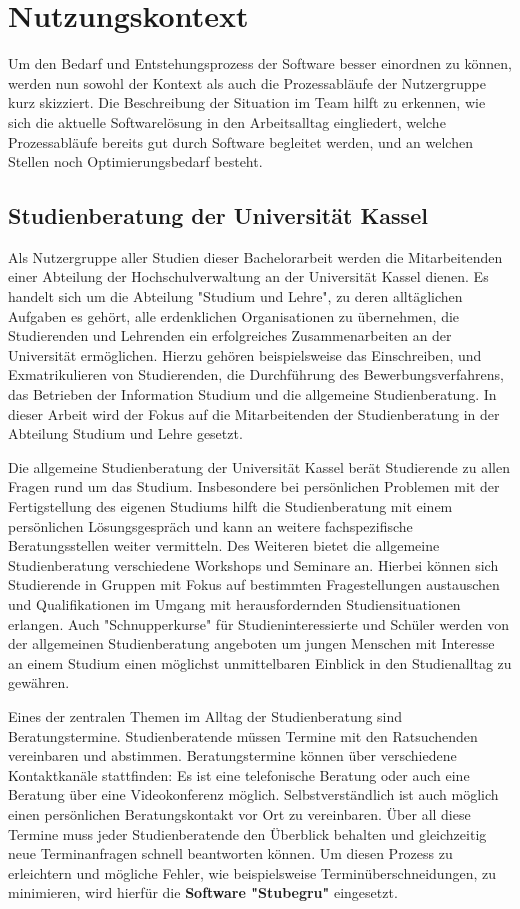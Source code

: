 \chapter{Nutzungskontext}
\label{chapterPractice}

Um den Bedarf und Entstehungsprozess der Software besser einordnen zu können,
werden nun sowohl der Kontext als auch die Prozessabläufe der Nutzergruppe kurz
skizziert. Die Beschreibung der Situation im Team hilft zu erkennen, wie sich
die aktuelle Softwarelösung in den Arbeitsalltag eingliedert, welche
Prozessabläufe bereits gut durch Software begleitet werden, und an welchen
Stellen noch Optimierungsbedarf besteht.

\section{Studienberatung der Universität Kassel}
Als Nutzergruppe aller Studien dieser Bachelorarbeit werden die Mitarbeitenden
einer Abteilung der Hochschulverwaltung an der Universität Kassel dienen. Es
handelt sich um die Abteilung "Studium und Lehre", zu deren alltäglichen
Aufgaben es gehört, alle erdenklichen Organisationen zu übernehmen, die
Studierenden und Lehrenden ein erfolgreiches Zusammenarbeiten an der
Universität ermöglichen. Hierzu gehören beispielsweise das Einschreiben, und
Exmatrikulieren von Studierenden, die Durchführung des Bewerbungsverfahrens,
das Betrieben der Information Studium und die allgemeine Studienberatung. In
dieser Arbeit wird der Fokus auf die Mitarbeitenden der Studienberatung in der
Abteilung Studium und Lehre gesetzt.

Die allgemeine Studienberatung der Universität Kassel berät Studierende zu
allen Fragen rund um das Studium. Insbesondere bei persönlichen Problemen mit
der Fertigstellung des eigenen Studiums hilft die Studienberatung mit einem
persönlichen Lösungsgespräch und kann an weitere fachspezifische
Beratungsstellen weiter vermitteln. Des Weiteren bietet die allgemeine
Studienberatung verschiedene Workshops und Seminare an. Hierbei können sich
Studierende in Gruppen mit Fokus auf bestimmten Fragestellungen austauschen und
Qualifikationen im Umgang mit herausfordernden Studiensituationen erlangen.
Auch "Schnupperkurse" für Studieninteressierte und Schüler werden von der
allgemeinen Studienberatung angeboten um jungen Menschen mit Interesse an einem
Studium einen möglichst unmittelbaren Einblick in den Studienalltag zu
gewähren.\cite{studBeratungKsWeb}

Eines der zentralen Themen im Alltag der Studienberatung sind Beratungstermine.
Studienberatende müssen Termine mit den Ratsuchenden vereinbaren und abstimmen.
Beratungstermine können über verschiedene Kontaktkanäle stattfinden: Es ist
eine telefonische Beratung oder auch eine Beratung über eine Videokonferenz
möglich. Selbstverständlich ist auch möglich einen persönlichen
Beratungskontakt vor Ort zu vereinbaren. Über all diese Termine muss jeder
Studienberatende den Überblick behalten und gleichzeitig neue Terminanfragen
schnell beantworten können. Um diesen Prozess zu erleichtern und mögliche
Fehler, wie beispielsweise Terminüberschneidungen, zu minimieren, wird hierfür
die \textbf{Software "Stubegru"} eingesetzt.

